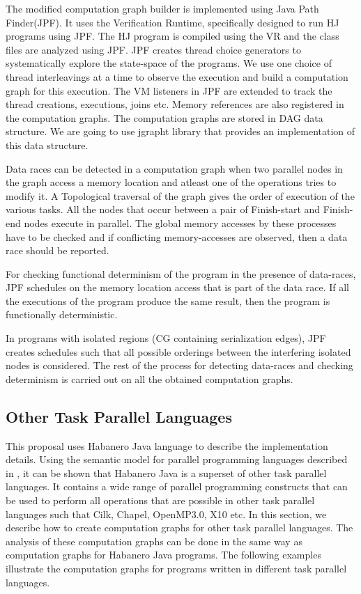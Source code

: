 The modified computation graph builder is implemented using Java Path Finder(JPF). It uses the Verification Runtime, specifically designed to run HJ programs using JPF. The HJ program is compiled using the VR and the class files are analyzed using JPF. JPF creates thread choice generators to systematically explore the state-space of the programs. We use one choice of thread interleavings at a time to observe the execution and build a computation graph for this execution. The VM listeners in JPF are extended to track the thread creations, executions, joins etc. Memory references are also registered in the computation graphs. The computation graphs are stored in DAG data structure. We are going to use jgrapht library that provides an implementation of this data structure.

Data races can be detected in a computation graph when two parallel nodes in the graph access a memory location and atleast one of the operations tries to modify it. A Topological traversal of the graph gives the order of execution of the various tasks. All the nodes that occur between  a pair of Finish-start and Finish-end nodes execute in parallel. The global memory accesses by these processes have to be checked and if conflicting memory-accesses are observed, then a data race should be reported.

For checking functional determinism of the program in the presence of data-races, JPF schedules on the memory location access that is part of the data race. If all the executions of the program produce the same result, then the program is functionally deterministic.

In programs with isolated regions (CG containing serialization edges), JPF creates schedules such that all possible orderings between the interfering isolated nodes is considered. The rest of the process for detecting data-races and checking determinism is carried out on all the obtained computation graphs.

\subsection{Other Task Parallel Languages}
This proposal uses Habanero Java language to describe the implementation details. Using the semantic model for parallel programming languages described in \cite{bouajjani2012analysis}, it can be shown that Habanero Java is a superset of other task parallel languages. It contains a wide range of parallel programming constructs that can be used to perform all operations that are possible in other task parallel languages such that Cilk, Chapel, OpenMP3.0, X10 etc. In this section, we describe how to create computation graphs for other task parallel languages. The analysis of these computation graphs can be done in the same way as computation graphs for Habanero Java programs. The following examples illustrate the computation graphs for programs written in different task parallel languages.

